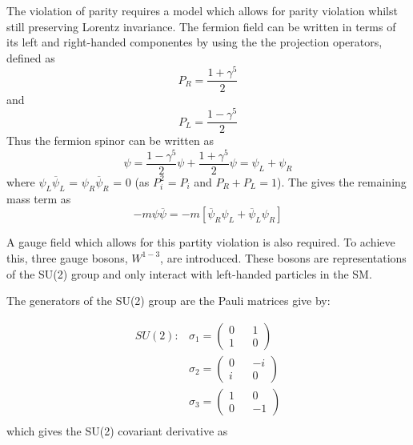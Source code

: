 The violation of parity requires a model which allows for parity violation whilst still preserving Lorentz invariance.
The fermion field can be written in terms of its left and right-handed componentes by using the the projection operators, defined as
\begin{equation}
  P_{R} = \frac{1+\gamma^{5}}{2}
\end{equation}
and
\begin{equation}
  P_{L} = \frac{1-\gamma^{5}}{2}
\end{equation}
Thus the fermion spinor can be written as
\begin{equation}
\psi = \frac{1-\gamma^{5}}{2}\psi + \frac{1+\gamma^{5}}{2}\psi = \psi_{L}+\psi_{R}
\end{equation}
where $\psi_{L}\overline{\psi}_{L}$ = $\psi_{R}\overline{\psi}_{R}$ = 0 (as $P_{i}^{2} = P_{i}$ and $P_{R} + P_{L} = 1$). The gives the remaining mass term as
\begin{equation}
  -m\psi\overline{\psi} = -m[\overline{\psi}_{R}\psi_{L} + \overline{\psi}_{L}\psi_{R}]
\end{equation}


A gauge field which allows for this partity violation is also required.  To achieve this, three gauge bosons, $W^{1-3}$, are introduced.  These bosons are representations of the SU(2) group and only interact with left-handed particles in the SM.

The generators of the SU(2) group are the Pauli matrices give by:

\begin{equation}
  \begin{split}
    SU(2):
    &\sigma_{1} =\begin{pmatrix}0&&1\\1&&0\end{pmatrix}\\
    &\sigma_{2} =\begin{pmatrix}0&&-i\\i&&0\end{pmatrix}\\
    &\sigma_{3} =\begin{pmatrix}1&&0\\0&&-1\end{pmatrix}\\
  \end{split}
\end{equation}
which gives the SU(2) covariant derivative as

